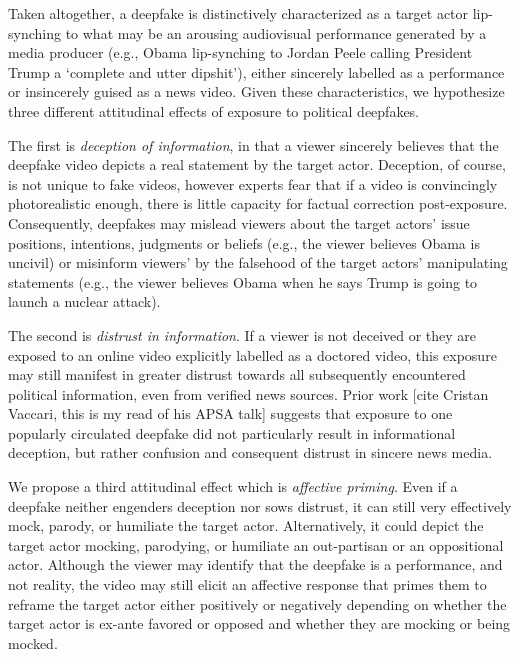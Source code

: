 Taken altogether, a deepfake is distinctively characterized as a
target actor lip-synching to what may be an arousing audiovisual
performance generated by a media producer (e.g., Obama lip-synching to
Jordan Peele calling President Trump a ‘complete and utter dipshit’),
either sincerely labelled as a performance or insincerely guised as a
news video. Given these characteristics, we hypothesize three
different attitudinal effects of exposure to political deepfakes.

The first is \emph{deception of information}, in that a viewer
sincerely believes that the deepfake video depicts a real statement by
the target actor. Deception, of course, is not unique to fake videos,
however experts fear that if a video is convincingly photorealistic
enough, there is little capacity for factual correction
post-exposure. Consequently, deepfakes may mislead viewers about the
target actors’ issue positions, intentions, judgments or beliefs
(e.g., the viewer believes Obama is uncivil) or misinform viewers’ by
the falsehood of the target actors’ manipulating statements (e.g., the
viewer believes Obama when he says Trump is going to launch a nuclear
attack).

The second is \emph{distrust in information}. If a viewer is not
deceived or they are exposed to an online video explicitly labelled as
a doctored video, this exposure may still manifest in greater distrust
towards all subsequently encountered political information, even from
verified news sources. Prior work [cite Cristan Vaccari, this is my
  read of his APSA talk] suggests that exposure to one popularly
circulated deepfake did not particularly result in informational
deception, but rather confusion and consequent distrust in sincere
news media.

We propose a third attitudinal effect which is \emph{affective
  priming}. Even if a deepfake neither engenders deception nor sows
distrust, it can still very effectively mock, parody, or humiliate the
target actor. Alternatively, it could depict the target actor mocking,
parodying, or humiliate an out-partisan or an oppositional
actor. Although the viewer may identify that the deepfake is a
performance, and not reality, the video may still elicit an affective
response that primes them to reframe the target actor either
positively or negatively depending on whether the target actor is
ex-ante favored or opposed and whether they are mocking or being
mocked.
